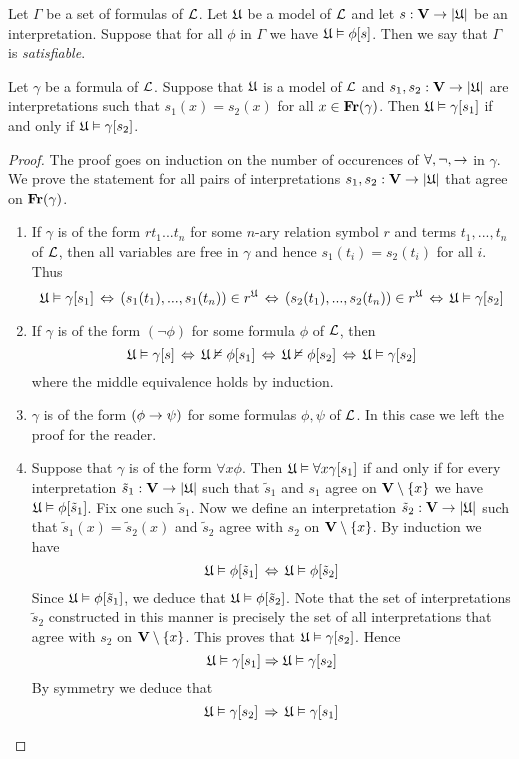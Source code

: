 \begin{definition}
Let $\Gamma$ be a set of formulas of ${\mathcal L}$. Let ${\mathfrak U}$ be a model of ${\mathcal L}$ and let $s: \mathbf{V} \rightarrow |{\mathfrak U}|$ be an interpretation. Suppose that for all $\phi$ in $\Gamma$ we have ${\mathfrak U} \vDash \phi[s]$. Then we say that $\Gamma$ is \textit{satisfiable}.
\end{definition}

\begin{proposition}\label{proposition:only_free_variables_matter_for_interpretation}
Let $\gamma$ be a formula of ${\mathcal L}$. Suppose that ${\mathfrak U}$ is a model of ${\mathcal L}$ and $s_1, s_2: \mathbf{V} \rightarrow |{\mathfrak U}|$ are interpretations such that $s_1(x) = s_2(x)$ for all $x\in \mathbf{Fr}(\gamma)$. Then ${\mathfrak U} \vDash \gamma[s_1]$ if and only if ${\mathfrak U} \vDash \gamma[s_2]$.
\end{proposition}
\begin{proof}
The proof goes on induction on the number of occurences of $\forall, \neg, \rightarrow$ in $\gamma$. We prove the
statement for all pairs of interpretations $s_1,s_2: \mathbf{V} \rightarrow |{\mathfrak U}|$ that agree on $\mathbf{Fr}(\gamma)$.
\begin{enumerate}[label=\textbf{(\arabic*)}, leftmargin=3.0em]
\item If $\gamma$ is of the form $rt_1 ...t_n$ for some $n$-ary relation symbol $r$ and terms $t_1,...,t_n$ of ${\mathcal L}$, then all variables are free in $\gamma$ and hence $s_1(t_i) = s_2(t_i)$ for all $i$. Thus
$${\mathfrak U} \vDash \gamma[s_1] \,\Leftrightarrow\, \left(s_1(t_1), ...,s_1(t_n)\right) \in r^{\mathfrak U} \,\Leftrightarrow\, \left(s_2(t_1),...,s_2(t_n)\right) \in r^{\mathfrak U} \,\Leftrightarrow\, {\mathfrak U} \vDash \gamma[s_2]$$
\item If $\gamma$ is of the form $(\neg \phi)$ for some formula $\phi$ of ${\mathcal L}$, then
$${\mathfrak U} \vDash \gamma[s] \,\Leftrightarrow\, {\mathfrak U} \nvDash \phi[s_1] \,\Leftrightarrow\, {\mathfrak U} \nvDash \phi[s_2] \,\Leftrightarrow\, {\mathfrak U} \vDash \gamma[s_2]$$
where the middle equivalence holds by induction.
\item $\gamma$ is of the form $(\phi \rightarrow \psi)$ for some formulas $\phi, \psi$ of ${\mathcal L}$. In this case we left the proof for the
reader.
\item Suppose that $\gamma$ is of the form $\forall x \phi$. Then ${\mathfrak U} \vDash \forall x \gamma[s_1]$ if and only if for every interpretation $\tilde{s}_1:\mathbf{V} \rightarrow |{\mathfrak U}|$ such that $\tilde{s}_1$ and $s_1$ agree on $\mathbf{V} \setminus\{x\}$ we have ${\mathfrak U} \vDash \phi[\tilde{s}_1]$. Fix one such $\tilde{s}_1$. Now we define an interpretation $\tilde{s}_2:\mathbf{V} \rightarrow |{\mathfrak U}|$ such that $\tilde{s}_1(x) = \tilde{s}_2(x)$ and $\tilde{s}_2$ agree with $s_2$ on $\mathbf{V} \setminus \{x\}$. By induction we have
$${\mathfrak U} \vDash \phi[\tilde{s}_1] \,\Leftrightarrow\, {\mathfrak U} \vDash \phi[\tilde{s}_2]$$
Since ${\mathfrak U} \vDash \phi[\tilde{s}_1]$, we deduce that ${\mathfrak U} \vDash \phi[\tilde{s}_2]$. Note that the set of interpretations $\tilde{s}_2$ constructed in this manner is precisely the set of all interpretations that agree with $s_2$ on $\mathbf{V} \setminus \{x\}$. This proves that ${\mathfrak U} \vDash \gamma[s_2]$. Hence
$${\mathfrak U} \vDash \gamma[s_1] \Rightarrow {\mathfrak U} \vDash \gamma[s_2]$$
By symmetry we deduce that
$${\mathfrak U} \vDash \gamma[s_2] \,\Rightarrow\, {\mathfrak U} \vDash \gamma[s_1]$$
\end{enumerate}
\end{proof}

